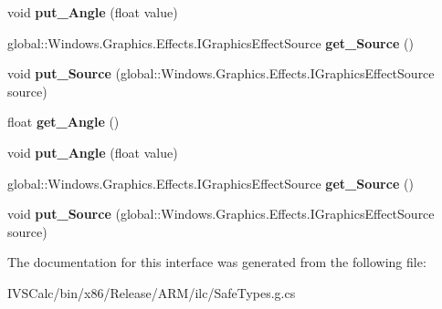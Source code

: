 \begin{DoxyCompactItemize}
void {\bfseries put\+\_\+\+Angle} (float value)
\item 
\mbox{\label{interface_microsoft_1_1_graphics_1_1_canvas_1_1_effects_1_1_i_hue_rotation_effect_a985c537972d6f1c44f2004ddbc228e45}} 
global\+::\+Windows.\+Graphics.\+Effects.\+I\+Graphics\+Effect\+Source {\bfseries get\+\_\+\+Source} ()
\item 
\mbox{\label{interface_microsoft_1_1_graphics_1_1_canvas_1_1_effects_1_1_i_hue_rotation_effect_add1d03b98525daf7cf8bd4e598fbd195}} 
void {\bfseries put\+\_\+\+Source} (global\+::\+Windows.\+Graphics.\+Effects.\+I\+Graphics\+Effect\+Source source)
\item 
\mbox{\label{interface_microsoft_1_1_graphics_1_1_canvas_1_1_effects_1_1_i_hue_rotation_effect_a7e1cc248274b2ef58fdb4796ecf993a2}} 
float {\bfseries get\+\_\+\+Angle} ()
\item 
\mbox{\label{interface_microsoft_1_1_graphics_1_1_canvas_1_1_effects_1_1_i_hue_rotation_effect_ae26bc54153b6d6e0b9c9981d3097859a}} 
void {\bfseries put\+\_\+\+Angle} (float value)
\item 
\mbox{\label{interface_microsoft_1_1_graphics_1_1_canvas_1_1_effects_1_1_i_hue_rotation_effect_a985c537972d6f1c44f2004ddbc228e45}} 
global\+::\+Windows.\+Graphics.\+Effects.\+I\+Graphics\+Effect\+Source {\bfseries get\+\_\+\+Source} ()
\item 
\mbox{\label{interface_microsoft_1_1_graphics_1_1_canvas_1_1_effects_1_1_i_hue_rotation_effect_add1d03b98525daf7cf8bd4e598fbd195}} 
void {\bfseries put\+\_\+\+Source} (global\+::\+Windows.\+Graphics.\+Effects.\+I\+Graphics\+Effect\+Source source)
\end{DoxyCompactItemize}


The documentation for this interface was generated from the following file\+:\begin{DoxyCompactItemize}
\item 
I\+V\+S\+Calc/bin/x86/\+Release/\+A\+R\+M/ilc/Safe\+Types.\+g.\+cs\end{DoxyCompactItemize}
